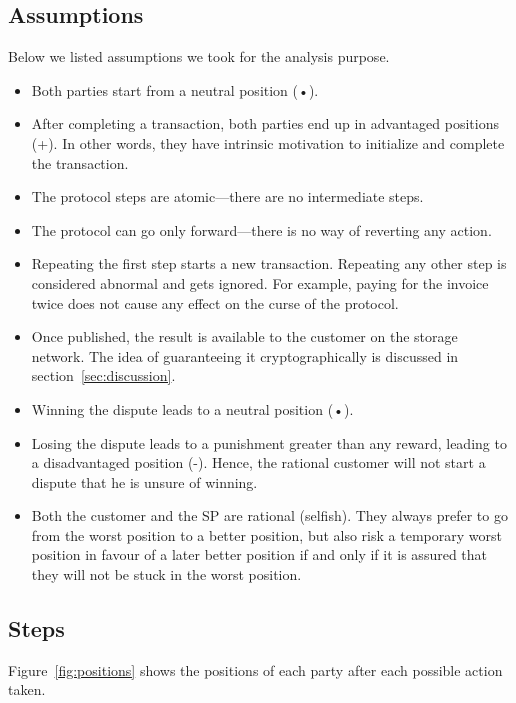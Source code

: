 \documentclass{ieeeaccess}
\begin{document}
\subsection{Assumptions}\label{assumptions}

Below we listed assumptions we took for the analysis purpose.  

\begin{itemize}

\item
    Both parties start from a neutral position (•).
\item
    After completing a transaction, both parties end up in advantaged positions (+). In other words, they have intrinsic motivation to initialize and complete the transaction.
\item
    The protocol steps are atomic—there are no intermediate steps.
\item 
    The protocol can go only forward—there is no way of reverting any action.
\item
    Repeating the first step starts a new transaction. Repeating any other step is considered abnormal and gets ignored. For example, paying for the invoice twice does not cause any effect on the curse of the protocol.
\item 
    Once published, the result is available to the customer on the storage network. The idea of guaranteeing it cryptographically is discussed in section~\ref{sec:discussion}.
    
\item
    Winning the dispute leads to a neutral position (•).

\item
    Losing the dispute leads to a punishment greater than any reward, leading to a disadvantaged position (-). Hence, the rational customer will not start a dispute that he is unsure of winning.
\item
    Both the customer and the SP are rational (selfish). They always prefer to go from the worst position to a better position, but also risk a temporary worst position in favour of a later better position if and only if it is assured that they will not be stuck in the worst position.
\end{itemize}

\subsection{Steps}\label{steps}

Figure~\ref{fig:positions} shows the positions of each party after each possible action taken.
\end{document}
